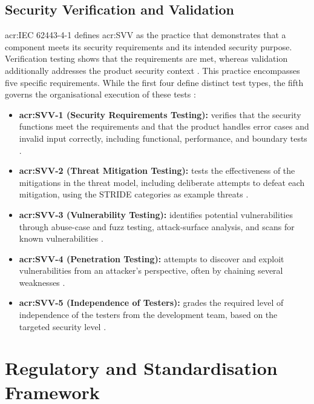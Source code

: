 \subsection{Security Verification and Validation}
\label{subsec:svv}

\gls{acr:IEC} 62443-4-1 defines \gls{acr:SVV} as the practice that demonstrates that a component meets its security requirements and its intended security purpose. Verification testing shows that the requirements are met, whereas validation additionally addresses the product security context \cite[p. 16]{DIN_EN_IEC_62443_4_1_2018}. This practice encompasses five specific requirements. While the first four define distinct test types, the fifth governs the organisational execution of these tests \cite[pp. 37]{DIN_EN_IEC_62443_4_1_2018}:
\begin{itemize}
	\item \textbf{\gls{acr:SVV}-1 (Security Requirements Testing):} verifies that the security functions meet the requirements and that the product handles error cases and invalid input correctly, including functional, performance, and boundary tests \cite[p. 38]{DIN_EN_IEC_62443_4_1_2018}.
	\item \textbf{\gls{acr:SVV}-2 (Threat Mitigation Testing):} tests the effectiveness of the mitigations in the threat model, including deliberate attempts to defeat each mitigation, using the STRIDE categories as example threats \cite[pp. 38]{DIN_EN_IEC_62443_4_1_2018}.
	\item \textbf{\gls{acr:SVV}-3 (Vulnerability Testing):} identifies potential vulnerabilities through abuse-case and fuzz testing, attack-surface analysis, and scans for known vulnerabilities \cite[p. 39]{DIN_EN_IEC_62443_4_1_2018}.
	\item \textbf{\gls{acr:SVV}-4 (Penetration Testing):} attempts to discover and exploit vulnerabilities from an attacker's perspective, often by chaining several weaknesses \cite[pp. 39]{DIN_EN_IEC_62443_4_1_2018}.
	\item \textbf{\gls{acr:SVV}-5 (Independence of Testers):} grades the required level of independence of the testers from the development team, based on the targeted security level \cite[pp. 40]{DIN_EN_IEC_62443_4_1_2018}.
\end{itemize}


\section{Regulatory and Standardisation Framework} 
\label{sec:regulatory_framework} 

